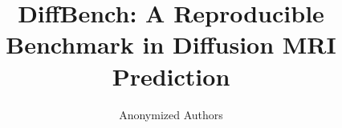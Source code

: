 \documentclass[runningheads]{llncs}
\begin{document}
%
\title{
    DiffBench: A Reproducible Benchmark in Diffusion MRI Prediction
}
%

\author{Anonymized Authors}  %
  
\end{document}
